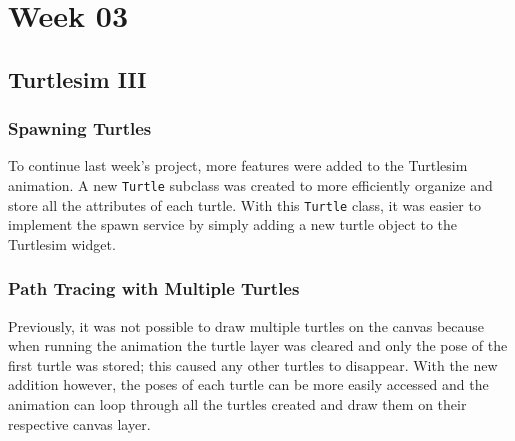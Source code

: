 \chapter{Week 03} %

\section{Turtlesim III}

    \subsection{Spawning Turtles}
        
        To continue last week's project, more features were added to the Turtlesim animation. A new \texttt{Turtle} subclass was created to more efficiently organize and store all the attributes of each turtle. With this \texttt{Turtle} class, it was easier to implement the spawn service by simply adding a new turtle object to the Turtlesim widget. 
        
    \subsection{Path Tracing with Multiple Turtles}
        
        Previously, it was not possible to draw multiple turtles on the canvas because when running the animation the turtle layer was cleared and only the pose of the first turtle was stored; this caused any other turtles to disappear. With the new addition however, the poses of each turtle can be more easily accessed and the animation can loop through all the turtles created and draw them on their respective canvas layer. 


